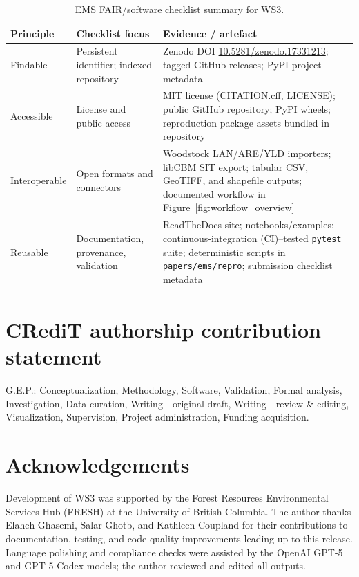 \documentclass[review]{elsarticle}
\begin{document}
\begin{table}[h]
  \centering
  \caption{EMS FAIR/software checklist summary for WS3.}
  \label{tab:fair-checklist}
  \footnotesize
  \begin{tabular}{p{2.1cm}p{3.4cm}p{6.1cm}}
    \toprule
    Principle & Checklist focus & Evidence / artefact \\
    \midrule
    Findable & Persistent identifier; indexed repository & Zenodo DOI \href{https://doi.org/10.5281/zenodo.17331213}{10.5281/zenodo.17331213}; tagged GitHub releases; PyPI project metadata \\
    Accessible & License and public access & MIT license (CITATION.cff, LICENSE); public GitHub repository; PyPI wheels; reproduction package assets bundled in repository \\
    Interoperable & Open formats and connectors & Woodstock LAN/ARE/YLD importers; libCBM SIT export; tabular CSV, GeoTIFF, and shapefile outputs; documented workflow in Figure~\ref{fig:workflow_overview} \\
    Reusable & Documentation, provenance, validation & ReadTheDocs site; notebooks/examples; continuous-integration (CI)–tested \texttt{pytest} suite; deterministic scripts in \texttt{papers/ems/repro}; submission checklist metadata \\
    \bottomrule
  \end{tabular}
\end{table}

\section*{CRediT authorship contribution statement}
G.E.P.: Conceptualization, Methodology, Software, Validation, Formal analysis, Investigation, Data curation, Writing—original draft, Writing—review \& editing, Visualization, Supervision, Project administration, Funding acquisition.

\section*{Acknowledgements}
Development of WS3 was supported by the Forest Resources Environmental Services Hub (FRESH) at the University of British Columbia. The author thanks Elaheh Ghasemi, Salar Ghotb, and Kathleen Coupland for their contributions to documentation, testing, and code quality improvements leading up to this release. Language polishing and compliance checks were assisted by the OpenAI GPT-5 and GPT-5-Codex models; the author reviewed and edited all outputs.
\end{document}
